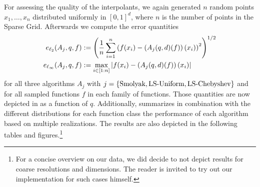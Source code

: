 \documentclass[12pt, oneside]{amsart}
\theoremstyle{definition}
\theoremstyle{remark}
\numberwithin{equation}{section}
\begin{document}
For assessing the quality of the interpolants, we again generated $n$ random points 
$x_1, \ldots, x_n$ distributed uniformly in $[0,1]^d$, where $n$ is the number 
of points in the Sparse Grid. Afterwards we compute the error quantities
\begin{align*} 
	e_{\ell_2}(A_j,q,f) &:= \left(\frac{1}{n}\sum_{i=1}^{n}
	\left(f(x_i)-\left(A_j(q,d)(f)\right)(x_i)\right)^2\right)^{1/2}\\
	e_{\ell_\infty}(A_j,q,f) &:= \max_{i\in[1:n]} 
	\left \vert f(x_i)-\left(A_j(q,d)(f)\right)(x_i) \right \vert
\end{align*}
for all three algorithms $A_j$ with $j=\left\{\text{Smolyak}, \text{LS-Uniform}, 
\text{LS-Chebyshev}\right\}$ and for all sampled functions $f$ in each family of 
functions. Those quantities are now depicted in 
 as a function of $q$. 
Additionally,  summarizes in combination with 
the different distributions for each function class 
 the performance of each algorithm based on multiple realizations. 
The results are also depicted in the following tables and figures.\footnote{For a concise overview on our data, we did decide to not depict results for coarse resolutions and dimensions. The reader is invited to try out our implementation for such cases himself.}




\newpage


\end{document}
